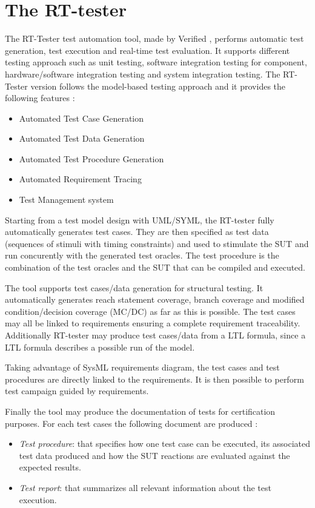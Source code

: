 \section{The RT-tester} 
\label{sec:RTTester}

The RT-Tester test automation tool, made by Verified
\cite{verified_website}, performs automatic test generation, test
execution and real-time test evaluation.  It supports different
testing approach such as unit testing, software integration testing
for component, hardware/software integration testing and system
integration testing.  The RT-Tester version  follows the
model-based testing approach \cite{Peleska2011} and
it provides the following features :
\begin{itemize}
\item Automated Test Case Generation 
\item Automated Test Data Generation 
\item Automated Test Procedure Generation 
\item Automated Requirement Tracing 
\item Test Management system 
\end{itemize}
Starting from a test model design with UML/SYML, the RT-tester fully
automatically generates test cases. They are then specified as test
data (sequences of stimuli with timing constraints) and used to
stimulate the SUT and run concurently with the generated test
oracles. The test procedure is the combination of the test oracles and
the SUT that can be compiled and executed.

The tool supports test cases/data generation for structural
testing. It automatically generates reach statement coverage, branch
coverage and modified condition/decision coverage (MC/DC) as far as
this is possible.  The test cases may all be linked to requirements
ensuring a complete requirement traceability.  Additionally RT-tester
may produce test cases/data from a LTL formula, since a LTL formula
describes a possible run of the model.

Taking advantage of SysML requirements diagram, the test cases and
test procedures are directly linked to the requirements. It is then
possible to perform test campaign guided by requirements.

Finally the tool may produce the documentation of tests for
certification purposes. For each test cases the following document are
produced :
\begin{itemize}
\item {\em Test procedure}: that specifies  how one test case can be
  executed, its associated test data produced and how the SUT
  reactions are evaluated against the expected results.
\item {\em Test report}: that summarizes all relevant information
  about the test execution.
\end{itemize}

